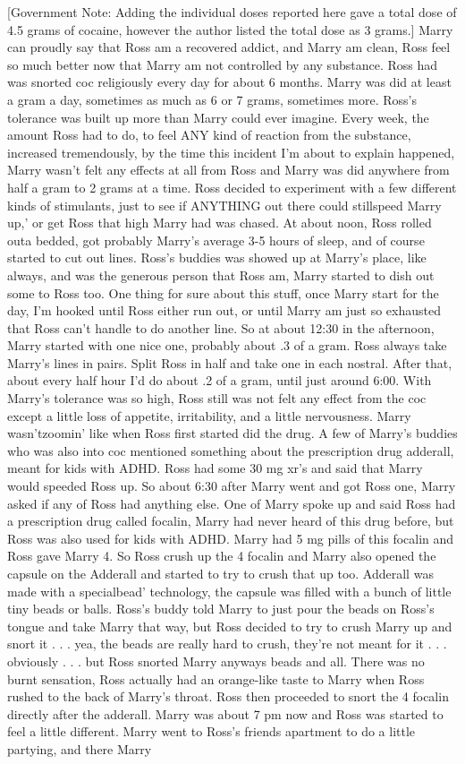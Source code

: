 \documentclass[12pt]{book}
\begin{document}
[Government Note: Adding the individual doses reported here gave a total dose of 4.5 grams of cocaine, however the author listed the total dose as 3 grams.] Marry can proudly say that Ross am a recovered addict, and Marry am clean, Ross feel so much better now that Marry am not controlled by any substance. Ross had was snorted coc religiously every day for about 6 months. Marry was did at least a gram a day, sometimes as much as 6 or 7 grams, sometimes more. Ross's tolerance was built up more than Marry could ever imagine. Every week, the amount Ross had to do, to feel ANY kind of reaction from the substance, increased tremendously, by the time this incident I'm about to explain happened, Marry wasn't felt any effects at all from Ross and Marry was did anywhere from half a gram to 2 grams at a time. Ross decided to experiment with a few different kinds of stimulants, just to see if ANYTHING out there could stillspeed Marry up,' or get Ross that high Marry had was chased. At about noon, Ross rolled outa bedded, got probably Marry's average 3-5 hours of sleep, and of course started to cut out lines. Ross's buddies was showed up at Marry's place, like always, and was the generous person that Ross am, Marry started to dish out some to Ross too. One thing for sure about this stuff, once Marry start for the day, I'm hooked until Ross either run out, or until Marry am just so exhausted that Ross can't handle to do another line. So at about 12:30 in the afternoon, Marry started with one nice one, probably about .3 of a gram. Ross always take Marry's lines in pairs. Split Ross in half and take one in each nostral. After that, about every half hour I'd do about .2 of a gram, until just around 6:00. With Marry's tolerance was so high, Ross still was not felt any effect from the coc except a little loss of appetite, irritability, and a little nervousness. Marry wasn'tzoomin' like when Ross first started did the drug. A few of Marry's buddies who was also into coc mentioned something about the prescription drug adderall, meant for kids with ADHD. Ross had some 30 mg xr's and said that Marry would speeded Ross up. So about 6:30 after Marry went and got Ross one, Marry asked if any of Ross had anything else. One of Marry spoke up and said Ross had a prescription drug called focalin, Marry had never heard of this drug before, but Ross was also used for kids with ADHD. Marry had 5 mg pills of this focalin and Ross gave Marry 4. So Ross crush up the 4 focalin and Marry also opened the capsule on the Adderall and started to try to crush that up too. Adderall was made with a specialbead' technology, the capsule was filled with a bunch of little tiny beads or balls. Ross's buddy told Marry to just pour the beads on Ross's tongue and take Marry that way, but Ross decided to try to crush Marry up and snort it . . .  yea, the beads are really hard to crush, they're not meant for it . . .  obviously . . .  but Ross snorted Marry anyways beads and all. There was no burnt sensation, Ross actually had an orange-like taste to Marry when Ross rushed to the back of Marry's throat. Ross then proceeded to snort the 4 focalin directly after the adderall. Marry was about 7 pm now and Ross was started to feel a little different. Marry went to Ross's friends apartment to do a little partying, and there Marry 
\end{document}
